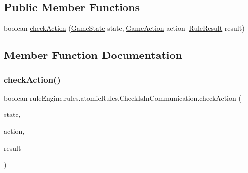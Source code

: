 \subsection*{Public Member Functions}
\begin{DoxyCompactItemize}
\item 
boolean \mbox{\hyperlink{classrule_engine_1_1rules_1_1atomic_rules_1_1_check_is_in_communication_a333d209cb3eb29f7af7a09685c95afeb}{check\+Action}} (\mbox{\hyperlink{classgame_1_1game_state_1_1_game_state}{Game\+State}} state, \mbox{\hyperlink{classrule_engine_1_1_game_action}{Game\+Action}} action, \mbox{\hyperlink{classrule_engine_1_1_rule_result}{Rule\+Result}} result)
\end{DoxyCompactItemize}


\subsection{Member Function Documentation}
\mbox{\label{classrule_engine_1_1rules_1_1atomic_rules_1_1_check_is_in_communication_a333d209cb3eb29f7af7a09685c95afeb}} 
\subsubsection{\texorpdfstring{check\+Action()}{checkAction()}}
{\footnotesize\ttfamily boolean rule\+Engine.\+rules.\+atomic\+Rules.\+Check\+Is\+In\+Communication.\+check\+Action (\begin{DoxyParamCaption}\item[{\mbox{\hyperlink{classgame_1_1game_state_1_1_game_state}{Game\+State}}}]{state,  }\item[{\mbox{\hyperlink{classrule_engine_1_1_game_action}{Game\+Action}}}]{action,  }\item[{\mbox{\hyperlink{classrule_engine_1_1_rule_result}{Rule\+Result}}}]{result }\end{DoxyParamCaption})\hspace{0.3cm}{\ttfamily [inline]}}



